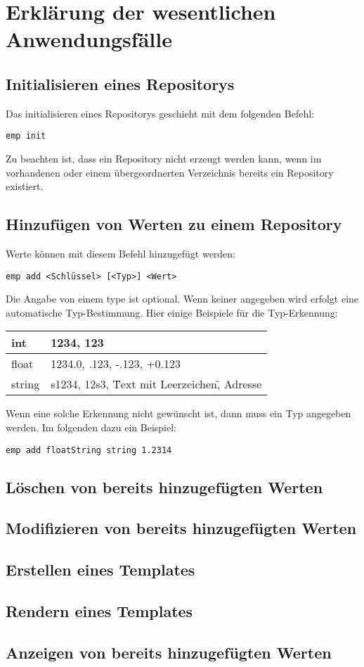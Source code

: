 
\section{Erklärung der wesentlichen Anwendungsfälle}

\subsection{Initialisieren eines Repositorys}
Das initialisieren eines Repositorys geschieht mit dem folgenden Befehl:
\begin{verbatim}
emp init
\end{verbatim}
Zu beachten ist, dass ein Repository nicht erzeugt werden kann, wenn im vorhandenen oder einem übergeordnerten Verzeichnis bereits ein Repository existiert.

\subsection{Hinzufügen von Werten zu einem Repository}
Werte können mit diesem Befehl hinzugefügt werden:
\begin{verbatim}
emp add <Schlüssel> [<Typ>] <Wert>
\end{verbatim}
Die Angabe von einem type ist optional. Wenn keiner angegeben wird erfolgt eine automatische Typ-Bestimmung.
Hier einige Beispiele für die Typ-Erkennung:

\begin{tabular}{| l | l |}
	\hline
	int & 1234, 123 \\
	\hline
	float & 1234.0, .123, -.123, +0.123 \\
	\hline
	string & s1234, 12s3, \"Text mit Leerzeichen\", Adresse \\
	\hline
\end{tabular} 

Wenn eine solche Erkennung nicht gewünscht ist, dann muss ein Typ angegeben werden. Im folgenden dazu ein Beispiel:
\begin{verbatim}
emp add floatString string 1.2314
\end{verbatim}

\subsection{Löschen von bereits hinzugefügten Werten}
\subsection{Modifizieren von bereits hinzugefügten Werten}
\subsection{Erstellen eines Templates}
\subsection{Rendern eines Templates}
\subsection{Anzeigen von bereits hinzugefügten Werten}